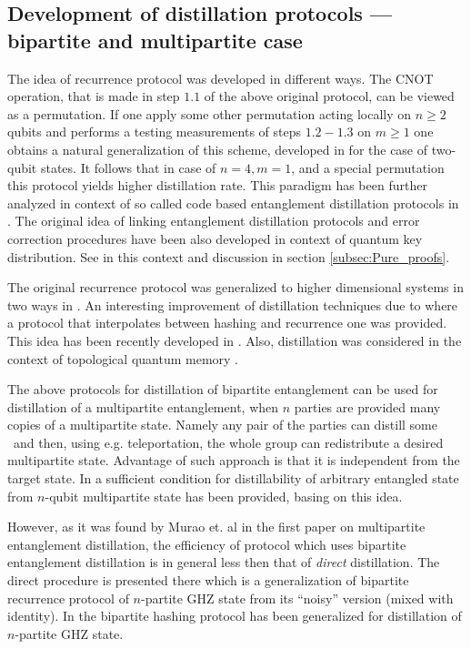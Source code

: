 \documentclass[rmp,12pt,preprint]{revtex4-2}
\begin{document}
\subsection{Development of distillation protocols --- bipartite and multipartite case}

The idea of recurrence protocol was developed in different ways.  The
CNOT operation, that is made in step $1.1$ of the above original
protocol, can be viewed as a permutation. If one apply some other
permutation acting locally on $n \geq 2$ qubits and performs a testing
measurements of steps $1.2-1.3$ on $m\geq 1$ one obtains a natural
generalization of this scheme, developed in \cite{DhaeneRecur} for the
case of two-qubit states. It follows that in case of $n=4, m=1$, and a
special permutation this protocol yields higher distillation
rate. This paradigm has been further analyzed in context of so called
code based entanglement distillation protocols
\cite{Matsumoto,AmbGot2way} in \cite{DehaeneEquiv}. The original idea
of \cite{BBPSSW1996} linking entanglement distillation protocols and
error correction procedures \cite{GottesmanPhd} have been also
developed in context of quantum key distribution. See in this context
\cite{Gottesman-Lo,AbainisSY_GenEntPur} and discussion in section
\ref{subsec:Pure_proofs}.

The original recurrence protocol was generalized to higher dimensional systems
in two ways in \cite{reduction,AlberetalGXOR}.  An interesting improvement of
distillation techniques due to \cite{VollbrechtV2004-hash-rec} where a
protocol that interpolates between hashing and recurrence one was
provided. This idea has been recently developed in
\cite{DehaeneBestHashBread}. Also, distillation was considered
in the context of topological quantum memory \cite{Bombin-dist}.


The above protocols for distillation of bipartite entanglement can be
used for distillation of a multipartite entanglement, when $n$ parties
are provided many copies of a multipartite state. Namely any pair of
the parties can distill some \eprpairs\ and then, using
e.g. teleportation, the whole group can redistribute a desired
multipartite state.  Advantage of such approach is that it is
independent from the target state.  In
\cite{DCpur,DurC_multi_dist2000} a sufficient condition for
distillability of arbitrary entangled state from $n$-qubit
multipartite state has been provided, basing on this idea.

However, as it was found by Murao et. al in the first paper
\cite{MPPVKmultidist} on multipartite entanglement distillation, the
efficiency of protocol which uses bipartite entanglement distillation
is in general less then that of {\it direct} distillation. The direct
procedure is presented there which is a generalization of bipartite
recurrence protocol of $n$-partite GHZ state from its ``noisy''
version (mixed with identity). In \cite{ManevaS_multi_hash2002} the
bipartite hashing protocol has been generalized for distillation of
$n$-partite GHZ state.
\end{document}
